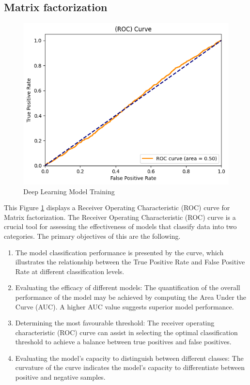\documentclass[9pt,twocolumn,twoside,lineno]{gsajnl}
\begin{document}
\subsection{Matrix factorization}
\begin{figure}
    \centering
    \includegraphics[width=\linewidth]{material/7.png}
    \caption{Deep Learning Model Training}
    \label{fig:6}
\end{figure}
This Figure \ref{fig:6} displays a Receiver Operating Characteristic (ROC) curve for Matrix factorization. The Receiver Operating Characteristic (ROC) curve is a crucial tool for assessing the effectiveness of models that classify data into two categories. The primary objectives of this are the following.

\begin{enumerate}
    \item The model classification performance is presented by the curve, which illustrates the relationship between the True Positive Rate and False Positive Rate at different classification levels.
    \item Evaluating the efficacy of different models: The quantification of the overall performance of the model may be achieved by computing the Area Under the Curve (AUC). A higher AUC value suggests superior model performance.
    \item Determining the most favourable threshold: The receiver operating characteristic (ROC) curve can assist in selecting the optimal classification threshold to achieve a balance between true positives and false positives.
    \item Evaluating the model's capacity to distinguish between different classes: The curvature of the curve indicates the model's capacity to differentiate between positive and negative samples.
\end{enumerate}
\end{document}

